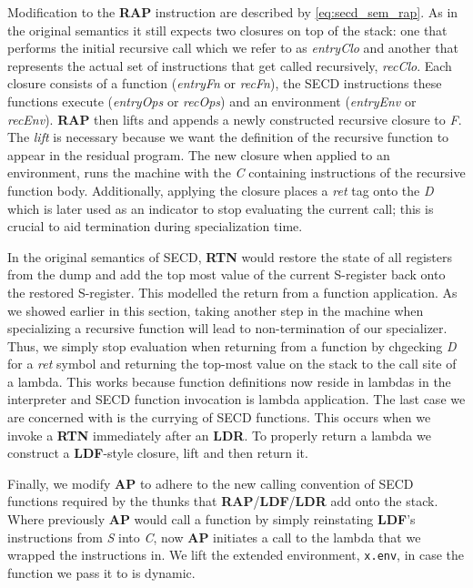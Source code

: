 \documentclass[a4paper,12pt,twoside,openright]{report}
\theoremstyle{definition}
\newcommand{\ts}{\textquotesingle}
\begin{document}
Modification to the \textbf{RAP} instruction are described by \eqref{eq:secd_sem_rap}. As in the original semantics it still expects two closures on top of the stack: one that performs the initial recursive call which we refer to as \textit{entryClo} and another that represents the actual set of instructions that get called recursively, \textit{recClo}. Each closure consists of a function (\textit{entryFn} or \textit{recFn}), the SECD instructions these functions execute (\textit{entryOps} or \textit{recOps}) and an environment (\textit{entryEnv} or \textit{recEnv}). \textbf{RAP} then lifts and appends a newly constructed recursive closure to \textit{F}. The \textit{lift} is necessary because we want the definition of the recursive function to appear in the residual program. The new closure when applied to an environment, runs the machine with the \textit{C} containing instructions of the recursive function body. Additionally, applying the closure places a \textit{{\ts}ret} tag onto the \textit{D} which is later used as an indicator to stop evaluating the current call; this is crucial to aid termination during specialization time.

In the original semantics of SECD, \textbf{RTN} would restore the state of all registers from the dump and add the top most value of the current S-register back onto the restored S-register. This modelled the return from a function application. As we showed earlier in this section, taking another step in the machine when specializing a recursive function will lead to non-termination of our specializer. Thus, we simply stop evaluation when returning from a function by chgecking \textit{D} for a \textit{{\ts}ret} symbol and returning the top-most value on the stack to the call site of a lambda. This works because function definitions now reside in lambdas in the interpreter and SECD function invocation is lambda application. The last case we are concerned with is the currying of SECD functions. This occurs when we invoke a \textbf{RTN} immediately after an \textbf{LDR}. To properly return a lambda we construct a \textbf{LDF}-style closure, lift and then return it.

Finally, we modify \textbf{AP} to adhere to the new calling convention of SECD functions required by the thunks that \textbf{RAP}/\textbf{LDF}/\textbf{LDR} add onto the stack. Where previously \textbf{AP} would call a function by simply reinstating \textbf{LDF}'s instructions from \textit{S} into \textit{C}, now \textbf{AP} initiates a call to the lambda that we wrapped the instructions in. We lift the extended environment, \texttt{x.env}, in case the function we pass it to is dynamic.
\end{document}
